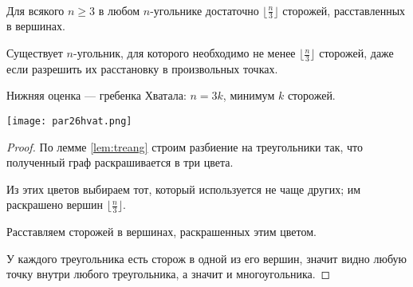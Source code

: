 \begin{theorem}[Хватал, 1975]~
    
    Для всякого $n \geq 3$ в любом $n$-угольнике достаточно $\lfloor \frac{n}{3} \rfloor$ сторожей, расставленных в вершинах.

    Существует $n$-угольник, для которого необходимо не менее $\lfloor \frac{n}{3} \rfloor$ сторожей, даже если разрешить их расстановку в произвольных точках.

\end{theorem}

Нижняя оценка --- гребенка Хватала: $n = 3k$, минимум $k$ сторожей.

\begin{center}
    \texttt{[image: par26hvat.png]}
\end{center}

\begin{proof}
    
    По лемме \ref*{lem:treang} строим разбиение на треугольники так, что полученный граф раскрашивается в три цвета.

    Из этих цветов выбираем тот, который используется не чаще других; им раскрашено вершин $\lfloor \frac{n}{3} \rfloor$.
    
    Расставляем сторожей в вершинах, раскрашенных этим цветом. 

    У каждого треугольника есть сторож в одной из его вершин, значит видно любую точку внутри любого треугольника, а значит и многоугольника.
\end{proof}